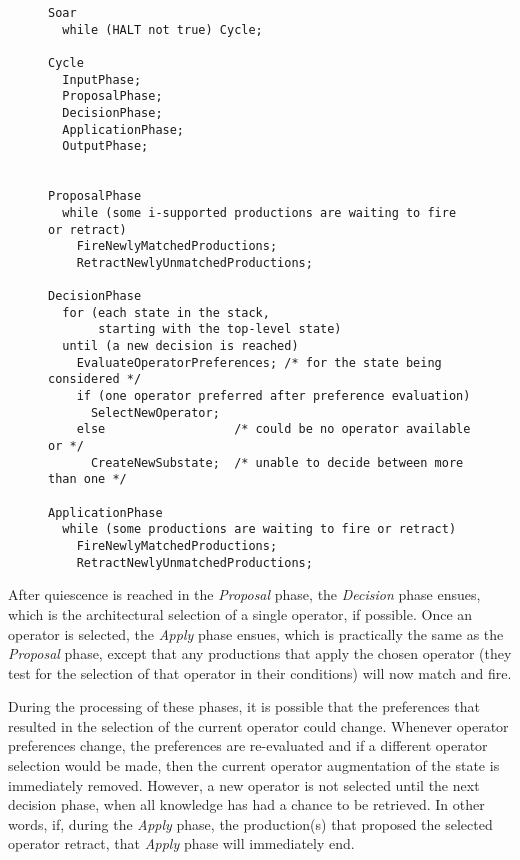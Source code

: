 \begin{figure}
\label{fig:decisioncycle}
\end{figure}

\begin{figure}
\begin{verbatim}
Soar
  while (HALT not true) Cycle;
  
Cycle
  InputPhase;
  ProposalPhase;
  DecisionPhase;
  ApplicationPhase;
  OutputPhase;


ProposalPhase
  while (some i-supported productions are waiting to fire or retract)
    FireNewlyMatchedProductions;
    RetractNewlyUnmatchedProductions;

DecisionPhase
  for (each state in the stack, 
       starting with the top-level state)
  until (a new decision is reached)
    EvaluateOperatorPreferences; /* for the state being considered */
    if (one operator preferred after preference evaluation)
      SelectNewOperator;
    else                  /* could be no operator available or */
      CreateNewSubstate;  /* unable to decide between more than one */

ApplicationPhase
  while (some productions are waiting to fire or retract)
    FireNewlyMatchedProductions;
    RetractNewlyUnmatchedProductions;
\end{verbatim}

\label{fig:pseudocode}
\end{figure}

After quiescence is reached in the \emph{Proposal} phase, the \emph{Decision} phase ensues, which is the architectural selection of a single operator, if possible. Once an operator is selected, the \emph{Apply} phase ensues, which is practically the same as the \emph{Proposal} phase, except that any productions that apply the chosen operator (they test for the selection of that operator in their conditions) will now match and fire.

During the processing of these phases, it is possible that the preferences that resulted in the selection of the current operator could change.  Whenever operator preferences change, the preferences are re-evaluated and if a different operator selection would be made, then the current operator augmentation of the state is immediately removed. However, a new operator is not selected until the next decision phase, when all knowledge has had a chance to be retrieved. In other words, if, during the \emph{Apply} phase, the production(s) that proposed the selected operator retract, that \emph{Apply} phase will immediately end.

